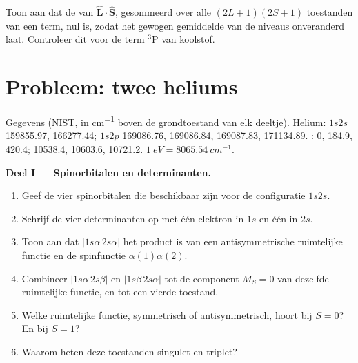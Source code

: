 \begin{exercise}[$\star\star\star$]\label{exo:b3:many-electron-atoms:12}
Toon aan dat de  van $\hat{\mathbf L}\cdot\hat{\mathbf S}$,
gesommeerd over alle $(2L+1)(2S+1)$ toestanden van een term, nul is, zodat
 het gewogen gemiddelde van de niveaus onveranderd
laat. Controleer dit voor de term ${}^3$P van koolstof.
\end{exercise}

\section{Probleem: twee heliums}

\begin{problem}
\label{pb:b3:many-electron-atoms:1}
Gegevens (NIST, in \unit{cm^{-1}} boven de grondtoestand van elk deeltje). Helium:
$1s2s$  159855.97,  166277.44; $1s2p$
 169086.76, 169086.84, 169087.83, 
171134.89. :  0, 184.9, 420.4; 
10538.4, 10603.6, 10721.2. $\qty{1}{eV} = \qty{8065.54}{cm^{-1}}$.

\medskip\noindent\textbf{Deel I --- Spinorbitalen en determinanten.}
\begin{enumerate}
  \item Geef de vier spinorbitalen die beschikbaar zijn voor de configuratie $1s2s$.
  \item Schrijf de vier determinanten op met één elektron in $1s$ en één in
        $2s$.
  \item Toon aan dat $|1s\alpha\,2s\alpha|$ het product is van een
        antisymmetrische ruimtelijke functie en de spinfunctie $\alpha(1)\alpha(2)$.
  \item Combineer $|1s\alpha\,2s\beta|$ en $|1s\beta\,2s\alpha|$ tot de
        component $M_S = 0$ van dezelfde ruimtelijke functie, en tot een vierde toestand.
  \item Welke ruimtelijke functie, symmetrisch of antisymmetrisch, hoort bij
        $S = 0$? En bij $S = 1$?
  \item Waarom heten deze toestanden singulet en triplet?
\end{enumerate}


\end{problem}
